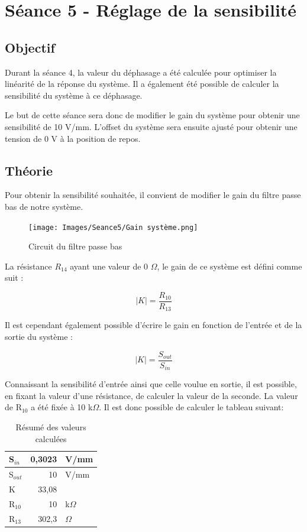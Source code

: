 \section{Séance 5 - Réglage de la sensibilité}
\subsection{Objectif}
Durant la séance 4, la valeur du déphasage a été calculée pour optimiser la linéarité
de la réponse du système. Il a également été possible de calculer la sensibilité du système
à ce déphasage.
\vspace{0.2cm}

Le but de cette séance sera donc de modifier le gain du système pour obtenir une sensibilité de
10 V/mm. L'offset du système sera ensuite ajusté pour obtenir une tension de 0 V à la position
de repos.
\vspace{0.2cm}

\subsection{Théorie}
Pour obtenir la sensibilité souhaitée, il convient de modifier le gain du filtre passe bas
de notre système.

\begin{figure}[H]
    \centering
    \texttt{[image: Images/Seance5/Gain système.png]}
    \caption{Circuit du filtre passe bas}
    \label{fig:FPB}
\end{figure}

La résistance $R_{14}$ ayant une valeur de 0 $\Omega$, le gain de ce système est défini comme suit :

\begin{equation*}
     |K| = \frac{R_{10}}{R_{13}}
\end{equation*}

Il est cependant également possible d'écrire le gain en fonction de l'entrée et de la sortie du
système :

\begin{equation*}
    |K| = \frac{S_{out}}{S_{in}}
\end{equation*}

Connaissant la sensibilité d'entrée ainsi que celle voulue en sortie, il est possible, en fixant
la valeur d'une résistance, de calculer la valeur de la seconde. La valeur de R$_{10}$ a été fixée
à 10 k$\Omega$. Il est donc possible de calculer le tableau suivant:


\begin{table}[H]
    \centering
    \begin{tabular}{|l|rl|}
    \cline{1-3}
    S$_{in}$  & 0,3023    & V/mm    \\ \hline
    S$_{out}$ & 10         & V/mm    \\ \hline
    K    & 33,08 &  \\ \hline
    R$_{10}$  & 10      & k$\Omega$     \\ \hline
    R$_{13}$  & 302,3     & $\Omega$     \\ \hline
    \end{tabular}
    \caption{Résumé des valeurs calculées}
    \label{tab:ResumeValeurs}
    \end{table}

